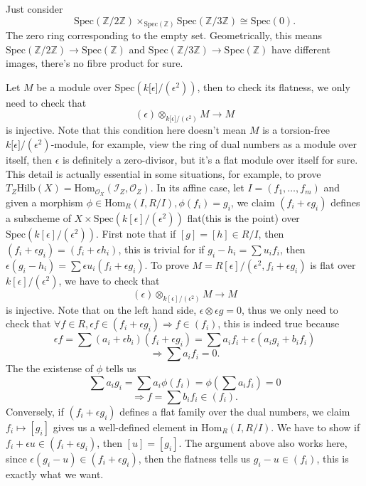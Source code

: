 \documentclass[../main.tex]{subfiles}
\begin{document}
\begin{example}[Fibre product of two schemes doesn't exist(we mean $=\emptyset$)]
Just consider $$\mathrm{Spec}(\mathbb{Z}/2\mathbb{Z})\times_{\mathrm{Spec}(\mathbb{Z})}\mathrm{Spec}(\mathbb{Z}/3\mathbb{Z})\cong \mathrm{Spec}(0).$$
The zero ring corresponding to the empty set. Geometrically, this means $\mathrm{Spec}(\mathbb{Z}/2\mathbb{Z})\rightarrow \mathrm{Spec}(\mathbb{Z})$ and $\mathrm{Spec}(\mathbb{Z}/3\mathbb{Z})\rightarrow \mathrm{Spec}(\mathbb{Z})$ have different images, there's no fibre product for sure.
\end{example}
\begin{example}
Let $M$ be a module over $\mathrm{Spec}(k\text{[}\epsilon\text{]}/(\epsilon^{2}))$, then to check its flatness, we only need to check that 
$$(\epsilon)\otimes_{k\text{[}\epsilon\text{]}/(\epsilon^{2})}M\rightarrow M$$
is injective. Note that this condition here doesn't mean $M$ is a torsion-free $k\text{[}\epsilon\text{]}/(\epsilon^{2})$-module, for example, view the ring of dual numbers as a module over itself, then $\epsilon$ is definitely a zero-divisor, but it's a flat module over itself for sure. This detail is actually essential in some situations, for example, to prove $T_{Z}\mathrm{Hilb}(X)=\mathrm{Hom}_{\mathcal{O}_{X}}(\mathcal{I}_{Z}, \mathcal{O}_{Z})$. In its affine case, let $I=(f_{1}, \dots, f_{m})$ and given a morphism $\phi\in \mathrm{Hom}_{R}(I, R/I), \phi(f_{i})=g_{i}$, we claim $(f_{i}+\epsilon g_{i})$ defines a subscheme of $X\times \mathrm{Spec}(k[\epsilon]/(\epsilon^{2}))$ flat(this is the point) over $\mathrm{Spec}(k[\epsilon]/(\epsilon^{2}))$. First note that if $[g]=[h]\in R/I$, then $(f_{i}+\epsilon g_{i})=(f_{i}+\epsilon h_{i})$, this is trivial for if $g_{i}-h_{i}=\sum u_{i}f_{i}$, then $\epsilon(g_{i}-h_{i})=\sum \epsilon u_{i}(f_{i}+\epsilon g_{i})$. To prove $M=R[\epsilon]/(\epsilon^{2}, f_{i}+\epsilon g_{i})$ is flat over $k[\epsilon]/(\epsilon^{2})$, we have to check that
$$(\epsilon)\otimes_{k[\epsilon]/(\epsilon^{2})}M\rightarrow M $$
is injective. Note that on the left hand side, $\epsilon \otimes \epsilon g=0$, thus we only need to check that $\forall f\in R, \epsilon f\in (f_{i}+\epsilon g_{i})\Rightarrow f\in (f_{i})$, this is indeed true because
$$\epsilon f=\sum(a_{i}+\epsilon b_{i})(f_{i}+\epsilon g_{i})=\sum a_{i}f_{i}+\epsilon(a_{i}g_{i}+b_{i}f_{i})$$
$$\Rightarrow \sum a_{i}f_{i}=0.$$
The the existense of $\phi$ tells us 
$$\sum a_{i}g_{i}=\sum a_{i}\phi(f_{i})=\phi(\sum a_{i}f_{i})=0$$
$$\Rightarrow f=\sum b_{i}f_{i}\in (f_{i}).$$
Conversely, if $(f_{i}+\epsilon g_{i})$ defines a flat family over the dual numbers, we claim $f_{i}\mapsto [g_{i}]$ gives us a well-defined element in $\mathrm{Hom}_{R}(I, R/I)$. We have to show if $f_{i}+\epsilon u\in (f_{i}+\epsilon g_{i})$, then $[u]=[g_{i}]$. The argument above also works here, since $\epsilon (g_{i}-u)\in (f_{i}+\epsilon g_{i})$, then the flatness tells us $g_{i}-u\in (f_{i})$, this is exactly what we want.


\end{example}
\end{document}

